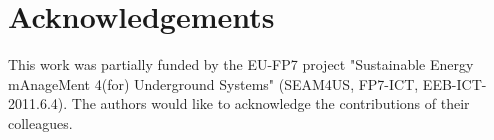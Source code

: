 \section{Acknowledgements}
\label{sec:acknowledgements}

This work was partially funded by the EU-FP7 project "Sustainable Energy mAnageMent 4(for) Underground Systems" (SEAM4US, FP7-ICT, EEB-ICT-2011.6.4). The authors would like to acknowledge the contributions of their colleagues.